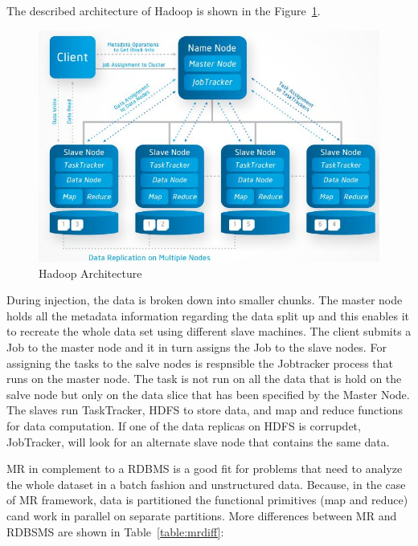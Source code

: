 The described architecture of Hadoop is shown in the \mbox{Figure \ref{hdfs_arch}}.

\begin{figure}[!ht]
\centering
\includegraphics[width=15cm]{hdfs_architecture}
\caption{Hadoop Architecture\cite{hdfsFigure}}\label{hdfs_arch}
\end{figure}

During injection, the data is broken down into smaller chunks. The master node holds all the metadata information regarding the data split up and this enables it to recreate the whole data set using different slave machines.\cite{blog} The client submits a Job to the master node and it in turn assigns the Job to the slave nodes. For assigning the tasks to the salve nodes is respnsible the Jobtracker process that runs on the master node. The task is not run on all the data that is hold on the salve node but only on the data slice that has been specified by the Master Node. The slaves run TaskTracker, HDFS to store data, and map and reduce functions for data computation.\cite{rosebt} If one of the data replicas on HDFS is corrupdet, JobTracker, will look for an alternate slave node that contains the same data. 

MR in complement to a RDBMS is a good fit for problems that need to analyze the whole dataset in a batch fashion and unstructured data. Because, in the case of MR framework, data is partitioned the functional primitives (map and reduce) cand work in parallel on separate partitions. More differences between MR and RDBSMS are shown in \mbox {Table \ref{table:mrdiff}}:

